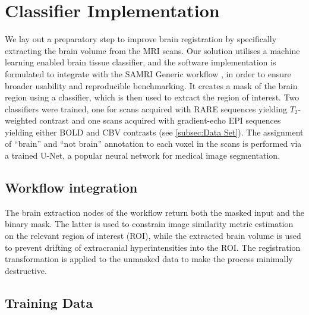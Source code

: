 \section{Classifier Implementation}
We lay out a preparatory step to improve brain registration by specifically extracting the brain volume from the MRI scans.
Our solution utilises a machine learning enabled brain tissue classifier, and the software implementation is formulated to integrate with the SAMRI Generic workflow \cite{ioanas_optimized_2019}, in order to ensure broader usability and reproducible benchmarking.
It creates a mask of the brain region using a classifier, which is then used to extract the region of interest.
Two classifiers were trained, one for scans acquired with RARE sequences yielding $T_2$-weighted contrast and one scans acquired with gradient-echo EPI sequences yielding either BOLD \cite{bold} and CBV \cite{cbv} contrasts (see \cref{subsec:Data Set}).
The assignment of “brain” and “not brain” annotation to each voxel in the scans is performed via a trained U-Net, a popular neural network for medical image segmentation.

\subsection{Workflow integration}
The brain extraction nodes of the workflow return both the masked input and the binary mask.
The latter is used to constrain image similarity metric estimation on the relevant region of interest (ROI), while the extracted brain volume is used to prevent drifting of extracranial hyperintensities into the ROI. %
The registration transformation is applied to the unmasked data to make the process minimally destructive.

\subsection{Training Data}

